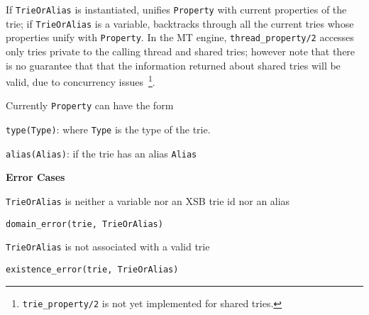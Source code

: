 \begin{description}
%
If {\tt TrieOrAlias} is instantiated, unifies {\tt Property} with
current properties of the trie; if {\tt TrieOrAlias} is a variable,
backtracks through all the current tries whose properties unify with
{\tt Property}.  In the MT engine, {\tt thread\_property/2} accesses
only tries private to the calling thread and shared tries; however
note that there is no guarantee that that the information returned
about shared tries will be valid, due to concurrency
issues~\footnote{{\tt trie\_property/2} is not yet implemented for
  shared tries.}.

Currently {\tt Property} can have the form 
\bi
\item {\tt type(Type)}: where {\tt Type} is the type of the trie.
%
\item {\tt alias(Alias)}: if the trie has an alias {\tt Alias}
\ei

{\bf Error Cases}
%
\bi
\item {\tt TrieOrAlias} is neither a variable nor an XSB trie id
  nor an alias
\bi
\item {\tt domain\_error(trie, TrieOrAlias)}
\ei
\item {\tt TrieOrAlias} is not associated with a valid trie
\bi
\item {\tt existence\_error(trie, TrieOrAlias)}
\ei
\ei

%
\end{description}

